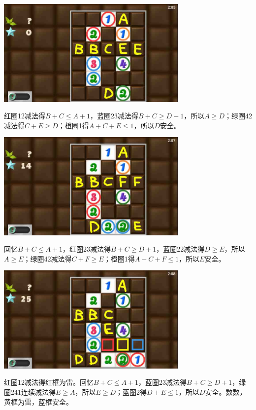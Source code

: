 \subsection{} %
\begin{center}
    \includegraphics[width=0.7\textwidth]{puzzlelow/229-1.jpg}
\end{center}
红圈12减法得$B+C\le A+1$，蓝圈23减法得$B+C\ge D+1$，所以$A\ge D$；绿圈42减法得$C+E\ge D$；橙圈1得$A+C+E\le 1$，所以$D$安全。
\begin{center}
    \includegraphics[width=0.7\textwidth]{puzzlelow/229-2.jpg}
\end{center}
回忆$B+C\le A+1$，红圈23减法得$B+C\ge D+1$，蓝圈22减法得$D\ge E$，所以$A\ge E$；绿圈42减法得$C+F\ge E$；橙圈1得$A+C+F\le 1$，所以$E$安全。
\begin{center}
    \includegraphics[width=0.7\textwidth]{puzzlelow/229-3.jpg}
\end{center}
红圈12减法得红框为雷。回忆$B+C\le A+1$，蓝圈23减法得$B+C\ge D+1$，绿圈241连续减法得$E\ge A$，所以$E\ge D$；蓝圈2得$D+E\le 1$，所以$D$安全。数数，黄框为雷，蓝框安全。
